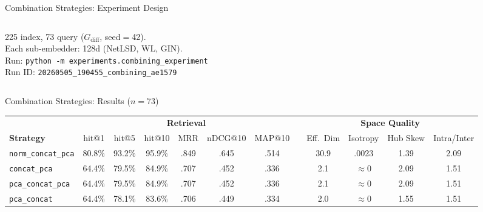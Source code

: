 \documentclass[aspectratio=169,10pt]{beamer}
\newcommand{\chit}[1]{\cellcolor{hit!30} #1}
\newcommand{\cmiss}[1]{\cellcolor{miss!25} #1}
\newcommand{\cwarn}[1]{\cellcolor{warn!30} #1}
\begin{document}
\begin{frame}[fragile]{Combination Strategies: Experiment Design}
\begin{columns}[T]
\begin{column}{0.47\textwidth}
  \vspace{0.6em}
  {\scriptsize\color{black!55}
  225 index, 73 query ($G_{\text{diff}}$, seed$=$42).\\
  Each sub-embedder: 128d (NetLSD, WL, GIN).\\
  Run: \texttt{python -m experiments.combining\_experiment}\\
  Run ID: \texttt{20260505\_190455\_combining\_ae1579}}

\end{column}
\end{columns}
\end{frame}


\begin{frame}{Combination Strategies: Results ($n{=}73$)}

  \centering
  \vspace{0.2em}
  {\small
  \renewcommand{\arraystretch}{1.35}
  \setlength{\tabcolsep}{4.5pt}
  \begin{tabular}{l *{6}{c} c *{4}{c}}
    \toprule
    & \multicolumn{6}{c}{\textbf{Retrieval}}
    && \multicolumn{4}{c}{\textbf{Space Quality}} \\
    \cmidrule{2-7} \cmidrule{9-12}
    \textbf{Strategy}
      & hit@1 & hit@5 & hit@10 & MRR & nDCG@10 & MAP@10
      && Eff.\ Dim & Isotropy & Hub Skew & Intra/Inter \\
    \midrule
    \rowcolor{c1!12}
    \texttt{norm\_concat\_pca}
      & \chit{80.8\%} & \chit{93.2\%} & \chit{95.9\%} & \chit{.849} & \chit{.645} & \chit{.514}
      && \chit{30.9} & .0023 & 1.39 & \chit{2.09} \\
    \texttt{concat\_pca}
      & \cmiss{64.4\%} & \cmiss{79.5\%} & \cmiss{84.9\%} & \cmiss{.707} & \cmiss{.452} & \cmiss{.336}
      && \cmiss{2.1} & \cmiss{$\approx$0} & \cwarn{2.09} & \cmiss{1.51} \\
    \texttt{pca\_concat\_pca}
      & \cmiss{64.4\%} & \cmiss{79.5\%} & \cmiss{84.9\%} & \cmiss{.707} & \cmiss{.452} & \cmiss{.336}
      && \cmiss{2.1} & \cmiss{$\approx$0} & \cwarn{2.09} & \cmiss{1.51} \\
    \texttt{pca\_concat}
      & \cmiss{64.4\%} & \cmiss{78.1\%} & \cmiss{83.6\%} & \cmiss{.706} & \cmiss{.449} & \cmiss{.334}
      && \cmiss{2.0} & \cmiss{$\approx$0} & 1.55 & \cmiss{1.51} \\
    \bottomrule
  \end{tabular}}

\end{frame}
\end{document}
